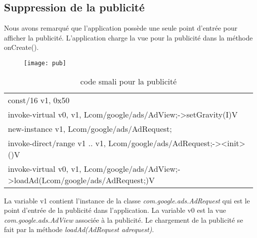 
\subsection{Suppression de la publicité}
Nous avons remarqué que l'application possède une seule point d'entrée pour afficher la publicité.
L'application charge la vue pour la publicité dans la méthode onCreate().
\begin{figure}[hp]
	      \begin{center}
		\texttt{[image: pub]}
	      \end{center}
\end{figure}

\begin{table}[here]
    \begin{center}
	\begin{tabular}{l}
	const/16 v1, 0x50 \\[0.2cm]
	
	invoke-virtual {v0, v1}, Lcom/google/ads/AdView;->setGravity(I)V \\[0.2cm]

	new-instance v1, Lcom/google/ads/AdRequest; \\[0.2cm]

	invoke-direct/range {v1 .. v1}, Lcom/google/ads/AdRequest;-><init>()V \\[0.2cm]

	invoke-virtual {v0, v1}, Lcom/google/ads/AdView;->loadAd(Lcom/google/ads/AdRequest;)V \\
	\end{tabular}
    \end{center}
    \caption{\label{}code smali pour la publicité}
\end{table} 
La variable v1 contient l'instance de la classe \textit{com.google.ads.AdRequest} qui est le point d'entrée de la publicité dans l'application.
La variable v0 est la vue \textit{com.google.ads.AdView} associée à la publicité. Le chargement de la publicité se fait par la méthode \textit{loadAd(AdRequest adrequest)}.
